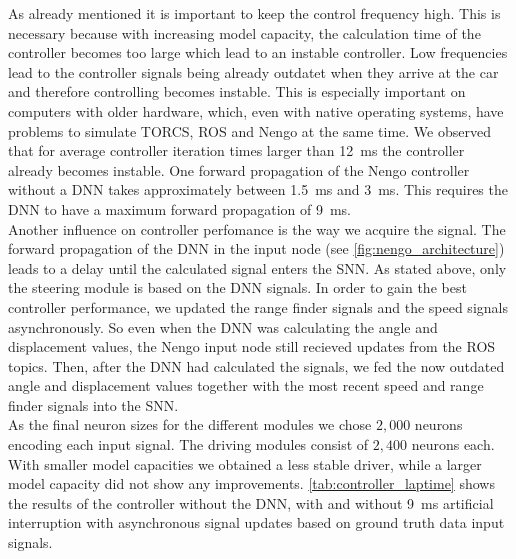 \documentclass[10pt,a4paper,twoside,journal]{IEEEtran}
\begin{document}
%
%
As already mentioned it is important to keep the control frequency high. This is necessary because with increasing model capacity, the calculation time of the controller becomes too large which lead to an instable controller. Low frequencies lead to the controller signals being already outdatet when they arrive at the car and therefore controlling becomes instable. This is especially important on computers with older hardware, which, even with native operating systems, have problems to simulate TORCS, ROS and Nengo at the same time. We observed that for average controller iteration times larger than \SI{12}{\milli\second} the controller already becomes instable. One forward propagation of the Nengo controller without a DNN takes approximately between \SI{1.5}{\milli\second} and \SI{3}{\milli\second}. This requires the DNN to have a maximum forward propagation of \SI{9}{\milli\second}. \\
Another influence on controller perfomance is the way we acquire the signal. The forward propagation of the DNN in the input node (see \autoref{fig:nengo_architecture}) leads to a delay until the calculated signal enters the SNN. As stated above, only the steering module is based on the DNN signals. In order to gain the best controller performance, we updated the range finder signals and the speed signals asynchronously. So even when the DNN was calculating the angle and displacement values, the Nengo input node still recieved updates from the ROS topics. Then, after the DNN had calculated the signals, we fed the now outdated angle and displacement values together with the most recent speed and range finder signals into the SNN. \\
As the final neuron sizes for the different modules we chose $2,000$ neurons encoding each input signal. The driving modules consist of $2,400$ neurons each. With smaller model capacities we obtained a less stable driver, while a larger model capacity did not show any improvements. \autoref{tab:controller_laptime} shows the results of the controller without the DNN, with and without \SI{9}{\milli\second} artificial interruption with asynchronous signal updates based on ground truth data input signals. \\
\end{document}
